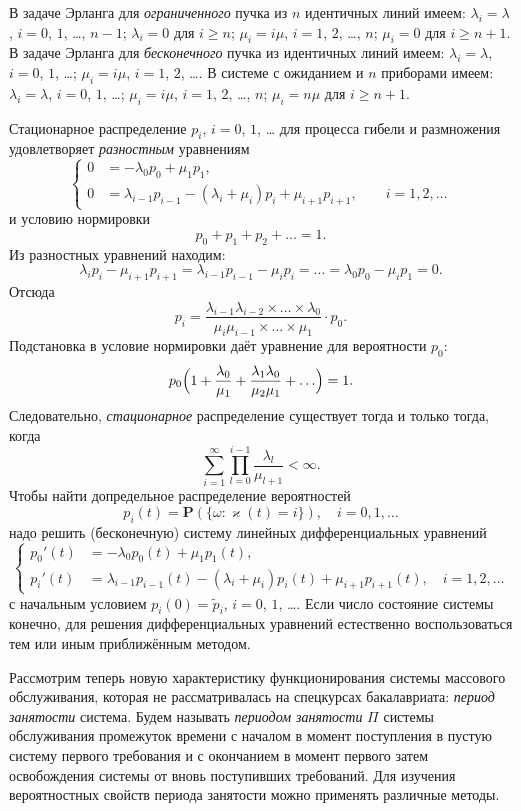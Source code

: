 \documentclass[10pt,oneside,final]{book}
\renewcommand{\Pr}{{\mathbf P}}
\begin{document}
В задаче Эрланга для \emph{ограниченного} пучка из $n$ идентичных линий имеем:
$\lambda_i=\lambda$, $i=0$, $1$, \ldots, $n-1$; $\lambda_i=0$ для $i\geqslant
n$; $\mu_i=i\mu$, $i=1$, $2$, \ldots, $n$; $\mu_i=0$ для $i\geqslant n+1$.  В
задаче Эрланга для \emph{бесконечного} пучка из идентичных линий имеем:
$\lambda_i=\lambda$, $i=0$, $1$, \ldots; $\mu_i=i\mu$, $i=1$, $2$, \ldots.  В
системе с ожиданием и $n$ приборами имеем: $\lambda_i=\lambda$, $i=0$, $1$,
\ldots;  $\mu_i=i\mu$, $i=1$, $2$,
\ldots, $n$; $\mu_i=n\mu$ для $i\geqslant n+1$.

Стационарное распределение $p_i$, $i=0$, $1$, \ldots{} для процесса гибели и
размножения удовлетворяет \emph{разностным} уравнениям
\[
  \left\{
    \begin{aligned}
      0&= -\lambda_0 p_0+\mu_1 p_1,\\
      0&= \lambda_{i-1}p_{i-1}-(\lambda_i+\mu_i)p_i+\mu_{i+1}p_{i+1}, \qquad
      i=1, 2, \ldots{}
    \end{aligned}
  \right.
\]
и условию нормировки
\[
p_0+p_1+p_2+\ldots=1.
\]
Из разностных уравнений находим:
\[
\lambda_{i}p_{i}-\mu_{i+1}p_{i+1}=\lambda_{i-1}p_{i-1}-\mu_{i}p_{i}=\ldots =
\lambda_0 p_0-\mu_i p_1=0.
\]
Отсюда
\[
p_i=\dfrac{\lambda_{i-1}\lambda_{i-2}\times\ldots\times\lambda_0}{\mu_i\mu_{i-1}\times\ldots\times
\mu_1}\cdot p_0.
\]
Подстановка в условие нормировки даёт уравнение для вероятности $p_0$:
\[
p_0 \Bigl(1+\dfrac{\lambda_0}{\mu_1}+\dfrac{\lambda_1\lambda_0}{\mu_2\mu_1}+\ldots
\Bigr)=1.
\]
Следовательно, \emph{стационарное} распределение существует тогда и только тогда, когда
\[
\sum_{i=1}^\infty \prod_{l=0}^{i-1} \dfrac{\lambda_l}{\mu_{l+1}}<\infty.
\]
Чтобы найти допредельное распределение вероятностей
\[
p_i(t)=\Pr(\{\omega\colon \varkappa(t)=i\}), \quad i=0, 1, \ldots
\]
надо решить (бесконечную) систему линейных дифференциальных уравнений
\[
\left\{
  \begin{aligned}
  p_0'(t)&=-\lambda_0 p_0(t)+\mu_1p_1(t),\\
  p_i'(t)&=\lambda_{i-1}p_{i-1}(t)-(\lambda_i+\mu_i)
  p_i(t)+\mu_{i+1}p_{i+1}(t),\quad
   i=1, 2, \ldots
 \end{aligned}
\right.
\]
с начальным условием $p_i(0)=\tilde{p}_i$, $i=0$, $1$, \ldots. Если число
состояние системы конечно, для решения дифференциальных уравнений естественно
воспользоваться тем или иным приближённым методом.

Рассмотрим теперь новую характеристику функционирования системы массового
обслуживания, которая не рассматривалась на спецкурсах бакалавриата:
\emph{период занятости} система. Будем называть \emph{периодом занятости} $\Pi$
системы обслуживания промежуток времени с началом в момент поступления в пустую
систему первого требования и с окончанием в момент первого затем освобождения
системы от вновь поступивших требований. Для изучения вероятностных свойств
периода занятости можно применять различные методы.
\end{document}
